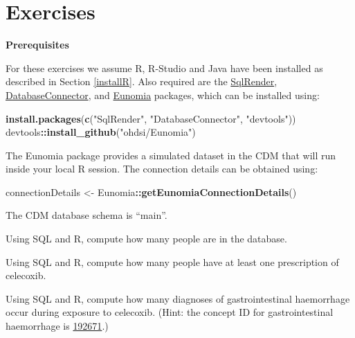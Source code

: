 \documentclass[11pt]{book}
\newenvironment{Shaded}{\begin{snugshade}}{\end{snugshade}}
\newcommand{\KeywordTok}[1]{\textcolor[rgb]{0.13,0.29,0.53}{\textbf{#1}}}
\newcommand{\NormalTok}[1]{#1}
\newcommand{\OperatorTok}[1]{\textcolor[rgb]{0.81,0.36,0.00}{\textbf{#1}}}
\newcommand{\StringTok}[1]{\textcolor[rgb]{0.31,0.60,0.02}{#1}}
\theoremstyle{definition}
\theoremstyle{definition}
\theoremstyle{definition}
\theoremstyle{remark}
\let\BeginKnitrBlock\begin \let\EndKnitrBlock\end
\begin{document}
\hypertarget{exercises-2}{%
\section{Exercises}\label{exercises-2}}

\textbf{Prerequisites}

For these exercises we assume R, R-Studio and Java have been installed as described in Section \ref{installR}. Also required are the \href{https://ohdsi.github.io/SqlRender/}{SqlRender}, \href{https://ohdsi.github.io/DatabaseConnector/}{DatabaseConnector}, and \href{https://ohdsi.github.io/Eunomia/}{Eunomia} packages, which can be installed using:

\begin{Shaded}
\begin{Highlighting}[]
\KeywordTok{install.packages}\NormalTok{(}\KeywordTok{c}\NormalTok{(}\StringTok{"SqlRender"}\NormalTok{, }\StringTok{"DatabaseConnector"}\NormalTok{, }\StringTok{"devtools"}\NormalTok{))}
\NormalTok{devtools}\OperatorTok{::}\KeywordTok{install_github}\NormalTok{(}\StringTok{"ohdsi/Eunomia"}\NormalTok{)}
\end{Highlighting}
\end{Shaded}

The Eunomia package provides a simulated dataset in the CDM that will run inside your local R session. The connection details can be obtained using:

\begin{Shaded}
\begin{Highlighting}[]
\NormalTok{connectionDetails <-}\StringTok{ }\NormalTok{Eunomia}\OperatorTok{::}\KeywordTok{getEunomiaConnectionDetails}\NormalTok{()}
\end{Highlighting}
\end{Shaded}

The CDM database schema is ``main''.

\BeginKnitrBlock{exercise}
\protect\hypertarget{exr:exercisePeopleCount}{}{\label{exr:exercisePeopleCount} }Using SQL and R, compute how many people are in the database.
\EndKnitrBlock{exercise}

\BeginKnitrBlock{exercise}
\protect\hypertarget{exr:exerciseCelecoxibUsers}{}{\label{exr:exerciseCelecoxibUsers} }Using SQL and R, compute how many people have at least one prescription of celecoxib.
\EndKnitrBlock{exercise}

\BeginKnitrBlock{exercise}
\protect\hypertarget{exr:exerciseGiBleedsDuringCelecoxib}{}{\label{exr:exerciseGiBleedsDuringCelecoxib} }Using SQL and R, compute how many diagnoses of gastrointestinal haemorrhage occur during exposure to celecoxib. (Hint: the concept ID for gastrointestinal haemorrhage is \href{http://athena.ohdsi.org/search-terms/terms/192671}{192671}.)
\EndKnitrBlock{exercise}
\end{document}
